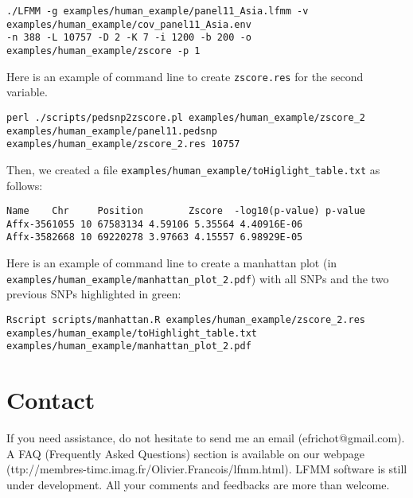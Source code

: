 \documentclass[10pt,a4paper]{article}
\begin{document}
\begin{Verbatim}[frame=single]
./LFMM -g examples/human_example/panel11_Asia.lfmm -v examples/human_example/cov_panel11_Asia.env 
-n 388 -L 10757 -D 2 -K 7 -i 1200 -b 200 -o examples/human_example/zscore -p 1
\end{Verbatim}
\noindent
Here is an example of command line to create \verb|zscore.res| for the second variable.
\begin{Verbatim}[frame=single]
perl ./scripts/pedsnp2zscore.pl examples/human_example/zscore_2 examples/human_example/panel11.pedsnp 
examples/human_example/zscore_2.res 10757
\end{Verbatim}
\noindent
Then, we created a file \verb|examples/human_example/toHiglight_table.txt| as follows:
\begin{Verbatim}[frame=single]
Name    Chr     Position        Zscore  -log10(p-value) p-value
Affx-3561055 10 67583134 4.59106 5.35564 4.40916E-06
Affx-3582668 10 69220278 3.97663 4.15557 6.98929E-05
\end{Verbatim}
\noindent
Here is an example of command line to create a manhattan plot (in \verb|examples/human_example/manhattan_plot_2.pdf|) with all SNPs and the two previous SNPs highlighted in green:
\begin{Verbatim}[frame=single]
Rscript scripts/manhattan.R examples/human_example/zscore_2.res 
examples/human_example/toHighlight_table.txt examples/human_example/manhattan_plot_2.pdf
\end{Verbatim}

\section{Contact}
If you need assistance, do not hesitate to send me an
email (efrichot@gmail.com). 
A FAQ (Frequently Asked Questions) section is available 
on our webpage (ttp://membres-timc.imag.fr/Olivier.Francois/lfmm.html). 
LFMM software is still under development. 
All your comments and feedbacks are more than welcome.



\end{document}
